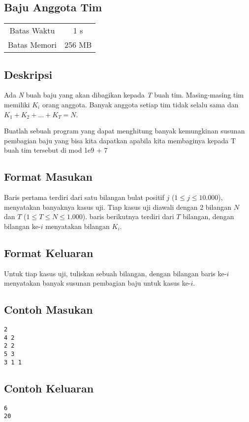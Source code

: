 \documentclass{article}
\begin{document}
\begin{center}

    
    \section*{Baju Anggota Tim} %

    \begin{tabular}{ | c c | }
        \hline
        Batas Waktu  & 1 s \\    %
        Batas Memori & 256 MB \\  %
        \hline
    \end{tabular}
\end{center}

\subsection*{Deskripsi}

Ada \textit{N} buah baju yang akan dibagikan kepada \textit{T} buah tim. Masing-masing tim memiliki $K_i$ orang anggota. Banyak anggota setiap tim tidak selalu sama dan $K_1 + K_2 + ... + K_T = N$.

Buatlah sebuah program yang dapat menghitung banyak kemungkinan susunan pembagian baju yang bisa kita dapatkan apabila kita membaginya kepada T buah tim tersebut di mod 1e9 + 7

\subsection*{Format Masukan}

Baris pertama terdiri dari satu bilangan bulat positif $j$ ($1 \leq j \leq 10.000$), menyatakan banyaknya kasus uji.
Tiap kasus uji diawali dengan 2 bilangan $N$ dan $T$ ($1 \leq T \leq N \leq  1.000$).
baris berikutnya terdiri dari $T$ bilangan, dengan bilangan ke-$i$ menyatakan bilangan $K_i$.

\subsection*{Format Keluaran}

Untuk tiap kasus uji, tuliskan sebuah bilangan, dengan bilangan baris ke-$i$ menyatakan banyak susunan pembagian baju untuk kasus ke-$i$.
\\

\begin{multicols}{2}
\subsection*{Contoh Masukan}
\begin{lstlisting}
2
4 2
2 2
5 3
3 1 1
\end{lstlisting}
\columnbreak
\subsection*{Contoh Keluaran}
\begin{lstlisting}
6
20
\end{lstlisting}
\vfill
\null
\end{multicols}
\end{document}
